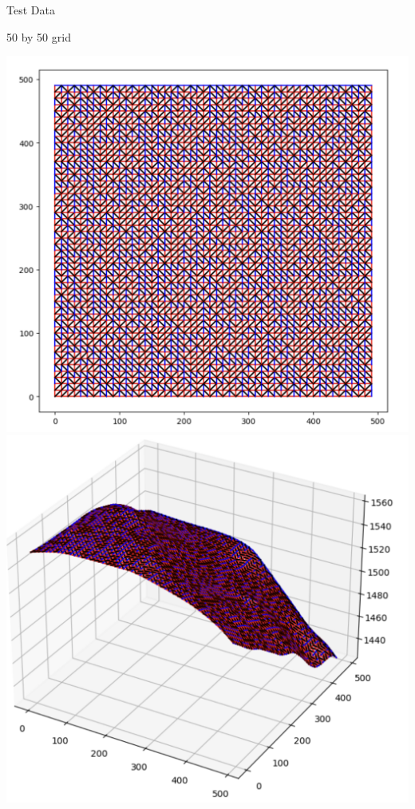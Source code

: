 \begin{frame}{Test Data}
\begin{center}
    
        50 by 50 grid
        
    \end{center}
    \begin{center}
        \includegraphics[scale=.3]{images/50by502d.png}
        \includegraphics[scale=.36]{images/50by503d.png}
        
        
    \end{center}

\end{frame}

